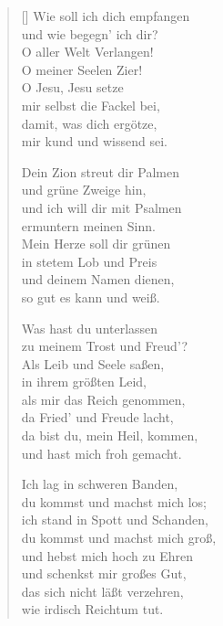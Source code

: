 \documentclass[fontsize=11pt]{scrartcl}
\begin{document}
                                                                                                        

\begin{multicols}{2}
\settowidth{\versewidth}{Wie soll ich dich empfangen}                                                  
\begin{verse}[\versewidth]                                                                                              
   Wie soll ich dich empfangen\\
  und wie begegn' ich dir?\\
  O aller Welt Verlangen!\\
  O meiner Seelen Zier!\\
  O Jesu, Jesu setze\\
  mir selbst die Fackel bei,\\
  damit, was dich ergötze,\\
  mir kund und wissend sei.

   Dein Zion streut dir Palmen\\
  und grüne Zweige hin,\\
  und ich will dir mit Psalmen\\
  ermuntern meinen Sinn.\\
  Mein Herze soll dir grünen\\
  in stetem Lob und Preis\\
  und deinem Namen dienen,\\
  so gut es kann und weiß.
  
   Was hast du unterlassen\\
  zu meinem Trost und Freud'?\\
  Als Leib und Seele saßen,\\
  in ihrem größten Leid,\\
  als mir das Reich genommen,\\
  da Fried' und Freude lacht,\\
  da bist du, mein Heil, kommen,\\
  und hast mich froh gemacht.
  
   Ich lag in schweren Banden,\\
  du kommst und machst mich los;\\
  ich stand in Spott und Schanden,\\
  du kommst und machst mich groß,\\
  und hebst mich hoch zu Ehren\\
  und schenkst mir großes Gut,\\
  das sich nicht läßt verzehren,\\
  wie irdisch Reichtum tut.


\end{verse}
\end{multicols}
\end{document}
